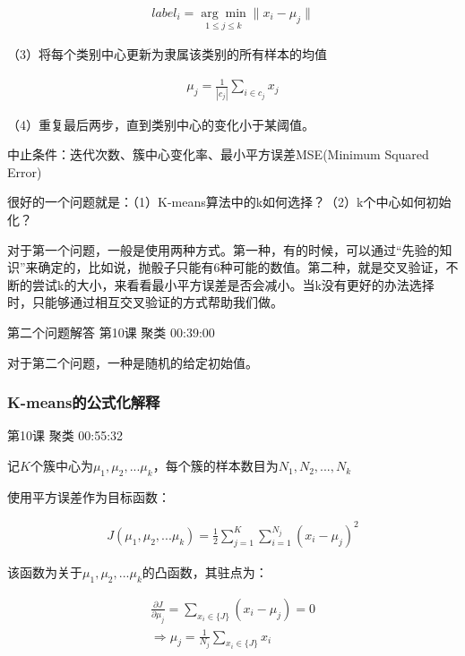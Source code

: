 \documentclass[UTF8]{ctexart}
\begin{document}
\begin{equation}
\begin{aligned}
label_{i} = \underset{1 \leq j \leq k}{\arg \min}  \parallel x_{i}-\mu_{j} \parallel
\end{aligned}
\end{equation}

（3）将每个类别中心更新为隶属该类别的所有样本的均值

\begin{equation}
\begin{aligned}
\mu_{j} = \frac{1}{|c_{j}|} \sum_{i \in c_{j}}^{ }x_{j}
\end{aligned}
\end{equation}

（4）重复最后两步，直到类别中心的变化小于某阈值。

中止条件：迭代次数、簇中心变化率、最小平方误差MSE(Minimum Squared Error)

很好的一个问题就是：（1）K-means算法中的k如何选择？（2）k个中心如何初始化？

对于第一个问题，一般是使用两种方式。第一种，有的时候，可以通过“先验的知识”来确定的，比如说，抛骰子只能有6种可能的数值。第二种，就是交叉验证，不断的尝试k的大小，来看看最小平方误差是否会减小。当k没有更好的办法选择时，只能够通过相互交叉验证的方式帮助我们做。

第二个问题解答 第10课 聚类 00:39:00

对于第二个问题，一种是随机的给定初始值。

\subsubsection{K-means的公式化解释}

第10课 聚类 00:55:32

记$K$个簇中心为$\mu_{1},\mu_{2},...\mu_{k}$，每个簇的样本数目为$N_{1},N_{2},...,N_{k}$

使用平方误差作为目标函数：

\begin{equation}
\begin{aligned}
J(\mu_{1},\mu_{2},...\mu_{k}) = \frac{1}{2} \sum_{j=1}^{K} \sum_{i=1}^{N_{j}} (x_{i}-\mu_{j})^{2}
\end{aligned}
\end{equation}

该函数为关于$\mu_{1},\mu_{2},...\mu_{k}$的凸函数，其驻点为：

\begin{equation}
\begin{aligned}
\frac{\partial J}{\partial \mu_{j}} = \sum_{x_{i} \in \{J\} }^{ }(x_{i}-\mu_{j}) = 0 \\
\Rightarrow \mu_{j}=\frac{1}{N_{j}} \sum_{x_{i} \in \{J\}}^{ }x_{i}
\end{aligned}
\end{equation}
\end{document}
